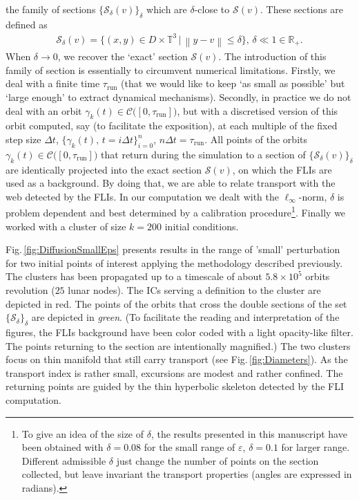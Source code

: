 \documentclass{amsart}
\theoremstyle{definition}
\theoremstyle{remark}
\numberwithin{equation}{section}
\newcommand{\norm}[1]{\left\lVert#1\right\rVert}
\begin{document}
the family of sections
$\{\mathcal{S}_{\delta}(v)\}_{\delta}$ which are $\delta$-close to $\mathcal{S}(v)$. These sections are defined as
\begin{align}
	\mathcal{S}_{\delta}(v)=\big\{ (x,y)\in D \times\mathbb{T}^{3} \, \vert \, \norm{y - v} \le \delta \big\}, \, \delta \ll 1\in \mathbb{R}_{+}.
\end{align}
When $\delta \to 0$, we recover the `exact' section $\mathcal{S}(v)$.
The introduction of this family of section is essentially to circumvent numerical limitations. Firstly, we deal with a finite time $\tau_{\textrm{run}}$ (that we would like to keep `as small as possible' but `large enough' to extract dynamical mechanisms). Secondly, in practice we do not deal with an orbit 
$\gamma_{k}(t)  \in \mathcal{C}\big([0,\tau_{\textrm{run}}]\big)$, but with a discretised version of this orbit computed, say (to facilitate the exposition), at each  multiple of the fixed step size $\Delta t$, 
$\{\gamma_{k}(t),\, t=i\Delta t\}_{i=0}^{n}$, $n \Delta t = \tau_{\textrm{run}}$. All points of the orbits $\gamma_{k}(t)  \in \mathcal{C}\big([0,\tau_{\textrm{run}}]\big)$ {\color{black}that} return during the simulation to a section of $\{\mathcal{S}_{\delta}(v)\}_{\delta}$ are
identically projected into the exact section $\mathcal{S}(v)$, on which the FLIs are used as a background. By doing that, we are able to relate transport with the web detected by the FLIs.
In our computation we dealt with the $\ell_{\infty}$-norm, $\delta$ is problem dependent and best determined by a calibration procedure\footnote{To give an idea of the size of $\delta$, the results presented in this manuscript have been obtained with $\delta = 0.08$ for the small range of $\varepsilon$, $\delta = 0.1$ for larger range. Different admissible $\delta$ just change the number of points on the section {\color{black}collected}, but leave invariant the transport properties (angles are expressed in radians).}. Finally we worked with a cluster of size $k=200$ initial conditions.

Fig.\,\ref{fig:DiffusionSmallEps} presents results in the range of 'small' perturbation for {\color{black}two initial} points of interest applying the methodology described previously.  
The clusters has been propagated up to a timescale  of  about $5.8 \times 10^{5}$ orbits revolution ($25$ lunar nodes). The ICs serving a definition to the cluster are depicted in {\color{black}red}. The  points of the orbits {\color{black}that} cross the double sections of the set $\{\mathcal{S}_{\delta}\}_{\delta}$ are depicted in {\it green}. {\color{black}(To facilitate the reading and interpretation of the figures, the FLIs background have been color coded with a light opacity-like filter. The points returning to the section are intentionally magnified.)} The two clusters
focus on thin manifold {\color{black}that} still carry transport (see Fig.\,\ref{fig:Diameters}). {\color{black}As the transport index is rather small, excursions are modest and rather confined.
The returning points are guided by the thin hyperbolic skeleton detected by the FLI computation.}  
\end{document}
